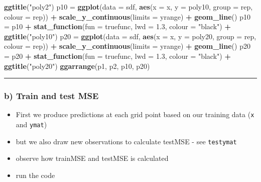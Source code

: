 \documentclass[]{article}
\newenvironment{Shaded}{\begin{snugshade}}{\end{snugshade}}
\newcommand{\KeywordTok}[1]{\textcolor[rgb]{0.13,0.29,0.53}{\textbf{#1}}}
\newcommand{\DataTypeTok}[1]{\textcolor[rgb]{0.13,0.29,0.53}{#1}}
\newcommand{\FloatTok}[1]{\textcolor[rgb]{0.00,0.00,0.81}{#1}}
\newcommand{\StringTok}[1]{\textcolor[rgb]{0.31,0.60,0.02}{#1}}
\newcommand{\OperatorTok}[1]{\textcolor[rgb]{0.81,0.36,0.00}{\textbf{#1}}}
\newcommand{\NormalTok}[1]{#1}
\providecommand{\tightlist}{%
  \setlength{\itemsep}{0pt}\setlength{\parskip}{0pt}}
\begin{document}
\begin{Shaded}
\begin{Highlighting}[]
\StringTok{    }\KeywordTok{ggtitle}\NormalTok{(}\StringTok{"poly2"}\NormalTok{)}
\NormalTok{p10 =}\StringTok{ }\KeywordTok{ggplot}\NormalTok{(}\DataTypeTok{data =}\NormalTok{ sdf, }\KeywordTok{aes}\NormalTok{(}\DataTypeTok{x =}\NormalTok{ x, }\DataTypeTok{y =}\NormalTok{ poly10, }\DataTypeTok{group =}\NormalTok{ rep, }\DataTypeTok{colour =}\NormalTok{ rep)) }\OperatorTok{+}\StringTok{ }
\StringTok{    }\KeywordTok{scale_y_continuous}\NormalTok{(}\DataTypeTok{limits =}\NormalTok{ yrange) }\OperatorTok{+}\StringTok{ }\KeywordTok{geom_line}\NormalTok{()}
\NormalTok{p10 =}\StringTok{ }\NormalTok{p10 }\OperatorTok{+}\StringTok{ }\KeywordTok{stat_function}\NormalTok{(}\DataTypeTok{fun =}\NormalTok{ truefunc, }\DataTypeTok{lwd =} \FloatTok{1.3}\NormalTok{, }\DataTypeTok{colour =} \StringTok{"black"}\NormalTok{) }\OperatorTok{+}\StringTok{ }
\StringTok{    }\KeywordTok{ggtitle}\NormalTok{(}\StringTok{"poly10"}\NormalTok{)}
\NormalTok{p20 =}\StringTok{ }\KeywordTok{ggplot}\NormalTok{(}\DataTypeTok{data =}\NormalTok{ sdf, }\KeywordTok{aes}\NormalTok{(}\DataTypeTok{x =}\NormalTok{ x, }\DataTypeTok{y =}\NormalTok{ poly20, }\DataTypeTok{group =}\NormalTok{ rep, }\DataTypeTok{colour =}\NormalTok{ rep)) }\OperatorTok{+}\StringTok{ }
\StringTok{    }\KeywordTok{scale_y_continuous}\NormalTok{(}\DataTypeTok{limits =}\NormalTok{ yrange) }\OperatorTok{+}\StringTok{ }\KeywordTok{geom_line}\NormalTok{()}
\NormalTok{p20 =}\StringTok{ }\NormalTok{p20 }\OperatorTok{+}\StringTok{ }\KeywordTok{stat_function}\NormalTok{(}\DataTypeTok{fun =}\NormalTok{ truefunc, }\DataTypeTok{lwd =} \FloatTok{1.3}\NormalTok{, }\DataTypeTok{colour =} \StringTok{"black"}\NormalTok{) }\OperatorTok{+}\StringTok{ }
\StringTok{    }\KeywordTok{ggtitle}\NormalTok{(}\StringTok{"poly20"}\NormalTok{)}
\KeywordTok{ggarrange}\NormalTok{(p1, p2, p10, p20)}
\end{Highlighting}
\end{Shaded}

\begin{center}\rule{0.5\linewidth}{\linethickness}\end{center}

\subsubsection{b) Train and test MSE}\label{b-train-and-test-mse}

\begin{itemize}
\tightlist
\item
  First we produce predictions at each grid point based on our training
  data (\texttt{x} and \texttt{ymat})
\item
  but we also draw new observations to calculate testMSE - see
  \texttt{testymat}
\item
  observe how trainMSE and testMSE is calculated
\item
  run the code
\end{itemize}
\end{document}
